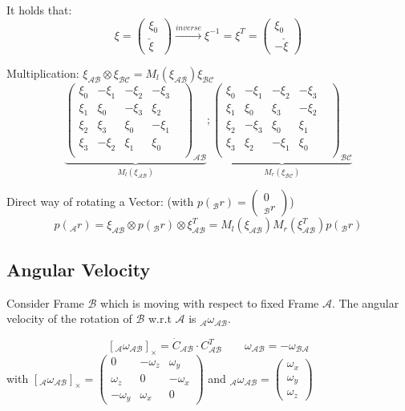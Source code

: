 \documentclass[fontsize=6pt,DIV=calc,a4paper,ngerman]{scrartcl}
\begin{document}
\begin{multicols*}{4}
	It holds that:
	$$\xi = \begin{pmatrix}\xi_0 \\ \check{\xi}\end{pmatrix} \xrightarrow[]{inverse} \xi^{-1} = \xi^T =\begin{pmatrix}\xi_0 \\ -\check{\xi}\end{pmatrix}$$

	Multiplication: $ \xi_\mathcal{AB}\otimes \xi_\mathcal{BC} = M_l(\xi_\mathcal{AB}) \xi_\mathcal{BC}$
	$$
		\underbrace{\left(\begin{smallmatrix}
					\xi_0 & -\xi_1 & -\xi_2 & -\xi_3 \\
					\xi_1 & \xi_0 & -\xi_3 & \xi_2 \\
					\xi_2 & \xi_3 & \xi_0 & -\xi_1 \\
					\xi_3 & -\xi_2 & \xi_1 & \xi_0 & \\
				\end{smallmatrix}\right)_\mathcal{AB} }_{M_l(\xi_\mathcal{AB})}
		;
		\underbrace{\left(\begin{smallmatrix}
					\xi_0 & -\xi_1 & -\xi_2 & -\xi_3 \\
					\xi_1 & \xi_0 & \xi_3 & -\xi_2 \\
					\xi_2 & -\xi_3 & \xi_0 & \xi_1 \\
					\xi_3 & \xi_2 & -\xi_1 & \xi_0 & \\
				\end{smallmatrix}\right)_\mathcal{BC} }_{M_r(\xi_\mathcal{BC})}
	$$

	\smallskip
	Direct way of rotating a Vector: (with $p({}_\mathcal{B}r)= \left(\begin{smallmatrix} 0 \\ {}_\mathcal{B}r\end{smallmatrix}\right)$)
	$$p({}_\mathcal{A}r)
		=\xi_\mathcal{AB} \otimes p({}_\mathcal{B}r) \otimes \xi^T_\mathcal{AB}
		=M_l(\xi_\mathcal{AB})M_r(\xi_\mathcal{AB}^T)p({}_\mathcal{B}r)$$

	\subsection{Angular Velocity}
	Consider Frame $\mathcal{B}$ which is moving with respect to fixed Frame $\mathcal{A}$. The angular velocity of the rotation of $\mathcal{B}$ w.r.t $\mathcal{A}$ is ${}_\mathcal{A}\omega_\mathcal{AB}$.

	$$ [{}_\mathcal{A}\omega_\mathcal{AB}]_\times=\dot{C}_\mathcal{AB}\cdot C_\mathcal{AB}^T \qquad \omega_\mathcal{AB} = -\omega_\mathcal{BA}$$
	with $ [{}_\mathcal{A}\omega_\mathcal{AB}]_\times =
		\left(\begin{smallmatrix}
				0 & -\omega_z & \omega_y \\
				\omega_z & 0 & -\omega_x \\
				-\omega_y & \omega_x & 0
			\end{smallmatrix}\right)
	$ and ${}_\mathcal{A}\omega_\mathcal{AB}=\begin{pmatrix}\omega_x \\ \omega_y\\\omega_z	\end{pmatrix}$


\end{multicols*}
\end{document}
